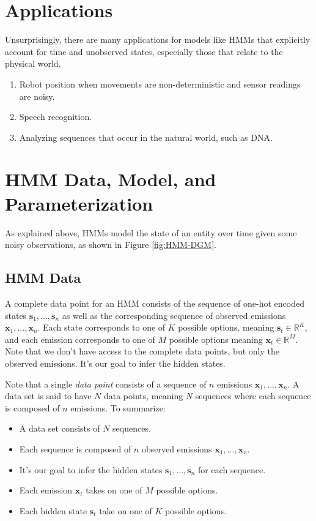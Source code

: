 \section{Applications}
Unsurprisingly, there are many applications for models like HMMs that explicitly account for time and unobserved states, especially those that relate to the physical world.
\begin{enumerate}
    \item Robot position when movements are non-deterministic and sensor readings are noisy.
    \item Speech recognition.
    \item Analyzing sequences that occur in the natural world, such as DNA.
\end{enumerate}

\section{HMM Data, Model, and Parameterization}
As explained above, HMMs model the state of an entity over time given some noisy observations, as shown in Figure \ref{fig:HMM-DGM}.

\subsection{HMM Data}
A complete data point for an HMM consists of the sequence of one-hot encoded states $\textbf{s}_1, ..., \textbf{s}_n$ as well as the corresponding sequence of observed emissions $\textbf{x}_1, ..., \textbf{x}_n$. Each state corresponds to one of $K$ possible options, meaning $\textbf{s}_t \in \mathbb{R}^K$, and each emission corresponds to one of $M$ possible options meaning $\textbf{x}_t \in \mathbb{R}^M$. Note that we don't have access to the complete data points, but only the observed emissions. It's our goal to infer the hidden states.

Note that a single \textit{data point} consists of a sequence of $n$ emissions $\textbf{x}_1, ..., \textbf{x}_n$. A data set is said to have $N$ data points, meaning $N$ sequences where each sequence is composed of $n$ emissions. To summarize:
\begin{itemize}
	\item A data set consists of $N$ sequences.
	\item Each sequence is composed of $n$ observed emissions $\textbf{x}_1, ..., \textbf{x}_n$.
	\item It's our goal to infer the hidden states $\textbf{s}_1, ..., \textbf{s}_n$ for each sequence.
	\item Each emission $\textbf{x}_{t}$ takes on one of $M$ possible options.
	\item Each hidden state $\textbf{s}_{t}$ take on one of $K$ possible options.
\end{itemize}


